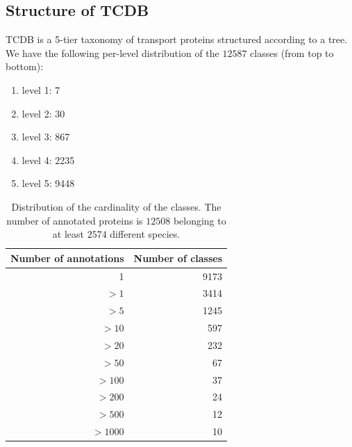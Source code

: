 \documentclass[english]{article}
\begin{document}
\subsection{Structure of TCDB}
\label{}
TCDB is a 5-tier taxonomy of transport proteins structured according to a tree.
We have the following per-level distribution of the $12587$ classes (from top to bottom):
\begin{enumerate}
\item level 1: 7  
\item level 2: 30
\item level 3: 867
\item level 4: 2235
\item level 5: 9448 
\end{enumerate}




\begin{table}[!h]
\caption {Distribution of the cardinality of the classes.
The number of annotated proteins is $12508$ belonging to at least $2574$ different species.}
\label{tab:datasources}
\vskip 0.05in
\centering
\begin{tabular}{| r | r |}
\hline
 \textbf{Number of annotations} 		&		\textbf{Number of classes}	 \\ 
 \hline
 1    &   9173 \\ \hline
 $> 1$   &   3414 \\ \hline
 $> 5 $     &   1245 \\ \hline
 $> 10$      &   597    \\ \hline
$ > 20 $        &   232   \\ \hline
 $> 50$        &   67   \\ \hline
 $> 100$ & 37  \\ \hline
 $> 200$  & 24  \\ \hline
 $> 500$ & 12  \\ \hline
 $> 1000$          &  10   \\
\hline
\end{tabular}
\normalsize
\end{table}
\end{document}
